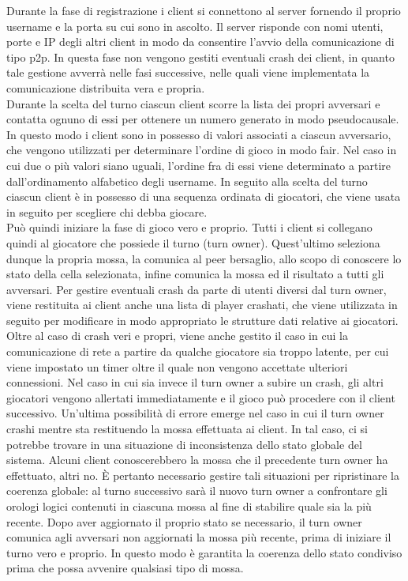 Durante la fase di registrazione i client si connettono al 
server fornendo il proprio username e la porta su cui sono in ascolto. Il 
server risponde con nomi utenti, porte e IP degli altri client in modo da 
consentire l'avvio della comunicazione di tipo p2p. In questa fase non vengono 
gestiti eventuali crash dei client, in quanto tale gestione avverrà nelle fasi 
successive, nelle quali viene implementata la comunicazione distribuita vera e 
propria.
\\
Durante la scelta del turno ciascun client scorre la lista dei propri 
avversari e contatta ognuno di essi per ottenere un numero generato in modo 
pseudocausale. In questo modo i client sono in possesso di valori associati a 
ciascun avversario, che vengono utilizzati per determinare l'ordine di gioco in 
modo fair. Nel caso in cui due o più valori siano uguali, l'ordine fra di essi 
viene determinato a partire dall'ordinamento alfabetico degli username. In 
seguito alla scelta del turno ciascun client è in possesso di una sequenza 
ordinata di giocatori, che viene usata in seguito per scegliere chi debba 
giocare.
\\
Può quindi iniziare la fase di gioco vero e proprio. Tutti i client si 
collegano quindi al giocatore che possiede il turno (turn owner). %
Quest'ultimo seleziona dunque la propria mossa, la comunica al peer bersaglio, 
allo scopo di conoscere lo stato della cella selezionata, infine comunica la 
mossa ed il risultato a tutti gli avversari. Per gestire eventuali crash 
da parte di utenti diversi dal turn owner, viene restituita ai client anche una 
lista di player crashati, che viene utilizzata in seguito per modificare in 
modo appropriato le strutture dati relative ai giocatori. Oltre al caso di crash 
veri e propri, viene anche gestito il caso in cui la comunicazione di rete a 
partire da qualche giocatore sia troppo latente, per cui viene impostato un 
timer oltre il quale non vengono accettate ulteriori connessioni.
Nel caso in cui sia invece il turn owner a subire un crash, gli altri giocatori 
vengono allertati immediatamente e il gioco può procedere con il client 
successivo.
Un'ultima possibilità di errore emerge nel caso in cui il turn owner crashi 
mentre sta restituendo la mossa effettuata ai client. In tal caso, ci 
si potrebbe trovare in una situazione di inconsistenza dello stato globale del 
sistema. Alcuni client conoscerebbero la mossa che il precedente turn owner ha 
effettuato, altri no. È pertanto necessario gestire tali situazioni per 
ripristinare la coerenza globale: al turno successivo sarà il nuovo turn owner 
a confrontare gli orologi logici contenuti in ciascuna mossa al fine di 
stabilire quale sia la più recente. Dopo aver aggiornato il proprio stato se 
necessario, il turn owner comunica agli avversari non aggiornati la mossa più 
recente, prima di iniziare il turno vero e proprio. In questo modo è garantita 
la coerenza dello stato condiviso prima che possa avvenire qualsiasi tipo di 
mossa.